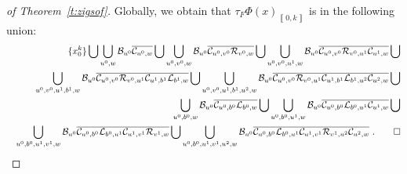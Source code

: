\documentclass{llncs}
\newcommand{\co}[2]{\left\llbracket #1,#2\right\llbracket}\newcommand{\cc}[2]{\left\llbracket #1,#2\right\rrbracket}\newcommand{\oo}[2]{\left\rrbracket #1,#2\right\llbracket}\newcommand{\oc}[2]{\left\rrbracket #1,#2\right\rrbracket}\newcommand{\ci}[1]{\co{#1}\infty}\newcommand{\io}[1]{\oo{-\infty}{#1}}\newcommand{\oi}[1]{\oo{#1}\infty}\newcommand{\ic}[1]{\oc{-\infty}{#1}}
\newcommand{\scc}[2]{_{\cc{#1}{#2}}}\newcommand{\sco}[2]{_{\co{#1}{#2}}}\newcommand{\soo}[2]{_{\oo{#1}{#2}}}\newcommand{\soc}[2]{_{\oc{#1}{#2}}}\newcommand{\sci}[1]{_{\ci{#1}}}\newcommand{\sio}[1]{_{\io{#1}}}\newcommand{\soi}[1]{_{\oi{#1}}}\newcommand{\sic}[1]{_{\ic{#1}}}
\begin{document}
\begin{proof}[of Theorem~\ref{t:zigsof}]
Globally, we obtain that $\tau_F\Phi(x)\scc0k$ is in the following union:
\begin{eqnarray*}
&& \{x_0^k\}\bigcup
\bigcup_{u^0,w} \mathcal B_{u^0}\overline{\mathcal C_{u^0,w}} \bigcup
\bigcup_{u^0,v^0,w}\mathcal B_{u^0}\overline{\mathcal C_{u^0,v^0}}\overline{\mathcal R_{v^0,w}} \bigcup
\bigcup_{u^0,v^0,u^1,w}\mathcal B_{u^0}\overline{\mathcal C_{u^0,v^0}}\overline{\mathcal R_{v^0,u^1}}\overline{\mathcal C_{u^1,w}} \bigcup\\
& & \bigcup_{u^0,v^0,u^1,b^1,w}\mathcal B_{u^0}\overline{\mathcal C_{u^0,v^0}}\overline{\mathcal R_{v^0,u^1}}\overline{\mathcal C_{u^1,b^1}}\overline{\mathcal L_{b^1,w}} \bigcup
\bigcup_{u^0,v^0,u^1,b^1,u^2,w}\mathcal B_{u^0}\overline{\mathcal C_{u^0,v^0}}\overline{\mathcal R_{v^0,u^1}}\overline{\mathcal C_{u^1,b^1}}\overline{\mathcal L_{b^1,u^2}}\overline{\mathcal C_{u^2,w}} \bigcup\\
& & \bigcup_{u^0,b^0,w}\mathcal B_{u^0}\overline{\mathcal C_{u^0,b^0}}\overline{\mathcal L_{b^0,w}} \bigcup
\bigcup_{u^0,b^0,u^1,w}\mathcal B_{u^0}\overline{\mathcal C_{u^0,b^0}}\overline{\mathcal L_{b^0,u^1}}\overline{\mathcal C_{u^1,w}} \bigcup\\
& & \bigcup_{u^0,b^0,u^1,v^1,w}\mathcal B_{u^0}\overline{\mathcal C_{u^0,b^0}}\overline{\mathcal L_{b^0,u^1}}\overline{\mathcal C_{u^1,v^1}}\overline{\mathcal R_{v^1,w}} \bigcup
\bigcup_{u^0,b^0,u^1,v^1,u^2,w}\mathcal B_{u^0}\overline{\mathcal C_{u^0,b^0}}\overline{\mathcal L_{b^0,u^1}}\overline{\mathcal C_{u^1,v^1}}\overline{\mathcal R_{v^1,u^2}}\overline{\mathcal C_{u^2,w}}~.
\qed
\end{eqnarray*}
\end{proof}
\end{document}
